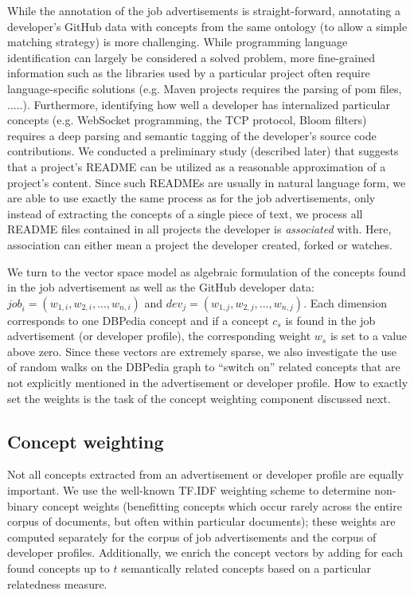 \documentclass[conference]{IEEEtran}
\begin{document}
While the annotation of the job advertisements is straight-forward, annotating a
developer's GitHub data with concepts from the same ontology (to allow a simple
matching strategy) is more challenging. While programming language
identification can largely be considered a solved problem, more fine-grained
information such as the libraries used by a particular project often require
language-specific solutions (e.g. Maven projects requires the parsing of pom
files, .....). Furthermore, identifying how well a developer has internalized
particular concepts (e.g. WebSocket programming, the TCP protocol, Bloom
filters) requires a deep parsing and semantic tagging of the developer's source
code contributions.  We conducted a preliminary study (described later) that
suggests that a project's README can be utilized as a reasonable approximation
of a project's content. Since such READMEs are usually in natural language form,
we are able to use exactly the same process as for the job advertisements, only
instead of extracting the concepts of a single piece of text, we process all
README files contained in all projects the developer is \emph{associated} with.
Here, association can either mean a project the developer created, forked or
watches.

We turn to the vector space model as algebraic formulation of the concepts found
in the job advertisement as well as the GitHub developer data:
$\textit{job}_i=(w_{1,i}, w_{2,i}, ..., w_{n,i})$ and $\textit{dev}_j=(w_{1,j},
w_{2,j}, ..., w_{n,j})$. Each dimension corresponds to one DBPedia concept and
if a concept $c_s$ is found in the job advertisement (or developer profile), the
corresponding weight $w_{s}$ is set to a value above zero. Since these vectors
are extremely sparse, we also investigate the use of random walks on the DBPedia
graph to ``switch on'' related concepts that are not explicitly mentioned in the
advertisement or developer profile. How to exactly set the weights is the task
of the concept weighting component discussed next.

\subsection{Concept weighting}

Not all concepts extracted from an advertisement or developer profile are
equally important. We use the well-known TF.IDF weighting scheme to determine
non-binary concept weights (benefitting concepts which occur rarely across the
entire corpus of documents, but often within particular documents); these
weights are computed separately for the corpus of job advertisements and the
corpus of developer profiles. Additionally, we enrich the concept vectors by
adding for each found concepts up to $t$ semantically related concepts based on
a particular relatedness measure.
\end{document}
